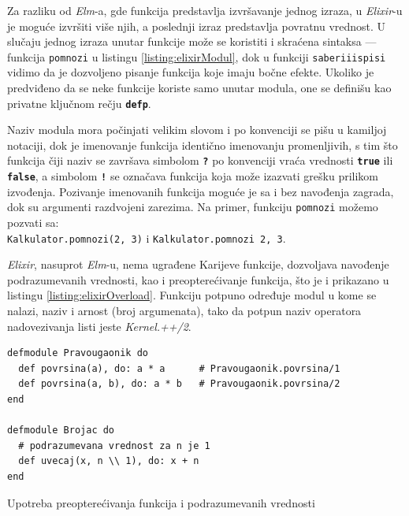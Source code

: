 \documentclass[12pt,oneside]{memoir}
\begin{document}
Za razliku od \emph{Elm}-a, gde funkcija predstavlja izvršavanje jednog izraza, u \emph{Elixir}-u
je moguće izvršiti više njih, a poslednji izraz predstavlja povratnu vrednost. U slučaju
jednog izraza unutar funkcije može se koristiti i skraćena sintaksa --- funkcija
\texttt{pomnozi} u listingu \ref{listing:elixirModul}, dok u funkciji
\texttt{saberi\textunderscore{}i\textunderscore{}ispisi} vidimo da je dozvoljeno pisanje
funkcija koje imaju bočne efekte. Ukoliko je predviđeno da se neke funkcije koriste samo
unutar modula, one se definišu kao privatne ključnom rečju \texttt{\textbf{defp}}.

Naziv modula mora počinjati velikim slovom i po konvenciji se pišu u kamiljoj notaciji, dok je 
imenovanje funkcija identično imenovanju promenljivih, s tim što funkcija čiji naziv se 
završava simbolom \texttt{\textbf{?}} po konvenciji vraća vrednosti \texttt{\textbf{true}} ili
\texttt{\textbf{false}}, a simbolom \texttt{\textbf{!}} se označava funkcija koja može izazvati
grešku prilikom izvođenja.
Pozivanje imenovanih funkcija moguće je sa i bez navođenja zagrada, dok su argumenti
razdvojeni zarezima. Na primer, funkciju \texttt{pomnozi} možemo pozvati sa:\\
\texttt{Kalkulator.pomnozi(2, 3)} i \texttt{Kalkulator.pomnozi 2, 3}.

\emph{Elixir}, nasuprot \emph{Elm}-u, nema ugrađene Karijeve funkcije, dozvoljava navođenje
podrazumevanih vrednosti, kao i preopterećivanje funkcija, što je i prikazano u listingu
\ref{listing:elixirOverload}. Funkciju potpuno određuje modul u kome se nalazi, naziv i
arnost (broj argumenata), tako da potpun naziv operatora nadovezivanja listi jeste
\emph{Kernel.++/2}. 
\begin{listing}[!h]
\begin{verbatim}
defmodule Pravougaonik do
  def povrsina(a), do: a * a      # Pravougaonik.povrsina/1
  def povrsina(a, b), do: a * b   # Pravougaonik.povrsina/2
end

defmodule Brojac do
  # podrazumevana vrednost za n je 1 
  def uvecaj(x, n \\ 1), do: x + n
end
\end{verbatim}
\caption{Upotreba preopterećivanja funkcija i podrazumevanih vrednosti }
\label{listing:elixirOverload}
\end{listing}
\end{document}
